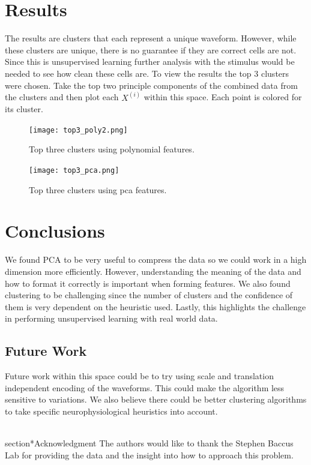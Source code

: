 \documentclass[conference]{IEEEtran}
\begin{document}
\section{Results}

The results are clusters that each represent a unique
waveform. However, while these clusters are unique, there is no
guarantee if they are correct cells are not. Since this is
unsupervised learning further analysis with the stimulus would be
needed to see how clean these cells are.
To view the results the top 3 clusters were chosen. Take the top two
principle components of the combined data from the clusters and then
plot each $X^{(i)}$ within this space. Each point is colored for its cluster.

\begin{figure}
\centering
\texttt{[image: top3\_poly2.png]}
\caption{Top three clusters using polynomial features.}
\texttt{[image: top3\_pca.png]}
\caption{Top three clusters using pca features.}
\end{figure}





\section{Conclusions}
We found PCA to be very useful to compress the data so we could work
in a high dimension more efficiently. However, understanding the
meaning of the data and how to format it correctly is important when
forming features. We also found clustering to be challenging since the
number of clusters and the confidence of them is very dependent on the
heuristic used.  Lastly, this highlights the challenge in performing
unsupervised learning with real world data.

\subsection{Future Work}
Future work within this space could be to try using scale and
translation independent encoding of the waveforms. This could make the
algorithm less sensitive to variations.  We also believe there could
be better clustering algorithms to take specific neurophysiological 
heuristics into account.


\\section*{Acknowledgment}
The authors would like to thank the Stephen Baccus Lab for providing
the data and the insight into how to approach this problem.




\end{document}
